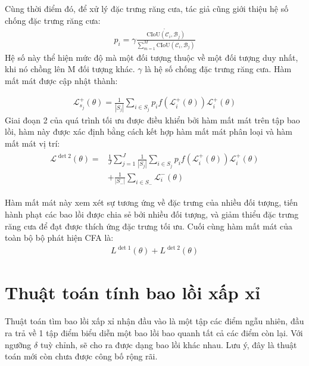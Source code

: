 \documentclass[12pt,a4paper,openany,oneside]{report}
\begin{document}
Cùng thời điểm đó, để xử lý đặc trưng răng cưa, tác giả cũng giới thiệu hệ số chống đặc trưng răng cưa:
\begin{align}\label{FAA_fomular}
	p_i = \gamma\dot{\frac{\mathrm{CIoU}(\mathcal{C}_i, \mathcal{B}_j)}{\sum_{m=1}^{M}\mathrm{CIoU}\left(\mathcal{C}_i, \mathcal{B}_j\right)}}
\end{align}
Hệ số này thể hiện mức độ mà một đối tượng thuộc về một đối tượng duy nhất, khi nó chồng lên M đối tượng khác. $\gamma$ là hệ số chống đặc trưng răng cưa.
Hàm mất mát được cập nhật thành: 

\begin{align}\label{loss_update}
	\mathcal{L}_{s_j}^{+}(\theta)=\frac{1}{\left|S_j\right|} \sum_{i \in S_j} p_i f\left(\mathcal{L}_i^{+}(\theta)\right) \mathcal{L}_i^{+}(\theta)
\end{align}
Giai đoạn 2 của quá trình tối ưu được điều khiển bởi hàm mất mát trên tập bao lồi, hàm này được xác định bằng cách kết hợp hàm mất mát phân loại và hàm mất mát vị trí:
\begin{align} \label{loss_det_2}
	\begin{aligned}
		\mathcal{L}^{\operatorname{det} 2}(\theta)= & \frac{1}{J} \sum_{j=1}^J \frac{1}{\left|S_j\right|} \sum_{i \in S_j} p_i f\left(\mathcal{L}_i^{+}(\theta)\right) \mathcal{L}_i^{+}(\theta) \\
		& +\frac{1}{\left|S_{-}\right|} \sum_{i \in S_{-}} \mathcal{L}_i^{-}(\theta)
	\end{aligned}
\end{align}

Hàm mất mát này xem xét sự tương ứng về đặc trưng của nhiều đối tượng, tiến hành phạt các bao lồi được chia sẻ bởi nhiều đối tượng, và giảm thiểu đặc trưng răng cưa để đạt được thích ứng đặc trưng tối ưu. Cuối cùng hàm mất mát của toàn bộ bộ phát hiện CFA là: 
\begin{align} \label{final_loss_CFA}
	L^{\operatorname{det} 1}(\theta)+L^{\operatorname{det} 2}(\theta)
\end{align}

\chapter{Thuật toán tính bao lồi xấp xỉ}
Thuật toán tìm bao lồi xấp xỉ nhận đầu vào là một tập các điểm ngẫu nhiên, đầu ra trả về 1 tập điểm biểu diễn một bao lồi bao quanh tất cả các điểm còn lại. Với ngưỡng $\delta$ tuỳ chỉnh, sẽ cho ra được dạng bao lồi khác nhau. Lưu ý, đây là thuật toán mới còn chưa được công bố rộng rãi.
\end{document}
